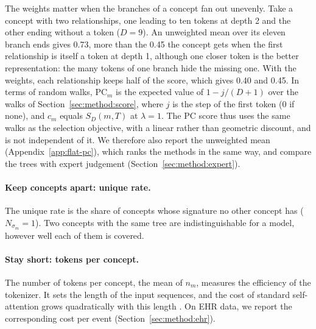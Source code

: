 The weights matter when the branches of a concept fan out unevenly.
Take a concept with two relationships, one leading to ten tokens at depth 2 and the other ending without a token ($D = 9$).
An unweighted mean over its eleven branch ends gives 0.73, more than the 0.45 the concept gets when the first relationship is itself a token at depth 1, although one closer token is the better representation: the many tokens of one branch hide the missing one.
With the weights, each relationship keeps half of the score, which gives 0.40 and 0.45.
In terms of random walks, $\mathrm{PC}_m$ is the expected value of $1 - j/(D + 1)$ over the walks of Section~\ref{sec:method:score}, where $j$ is the step of the first token (0 if none), and $c_m$ equals $S_D(m, T)$ at $\lambda = 1$.
The PC score thus uses the same walks as the selection objective, with a linear rather than geometric discount, and is not independent of it.
We therefore also report the unweighted mean (Appendix~\ref{app:flat-pc}), which ranks the methods in the same way, and compare the trees with expert judgement (Section~\ref{sec:method:expert}).

\paragraph{Keep concepts apart: unique rate.}
The unique rate is the share of concepts whose signature no other concept has ($N_{\sigma_m} = 1$).
Two concepts with the same tree are indistinguishable for a model, however well each of them is covered.

\paragraph{Stay short: tokens per concept.}
The number of tokens per concept, the mean of $n_m$, measures the efficiency of the tokenizer.
It sets the length of the input sequences, and the cost of standard self-attention grows quadratically with this length \cite{vaswani2017attention}.
On EHR data, we report the corresponding cost per event (Section~\ref{sec:method:ehr}).

